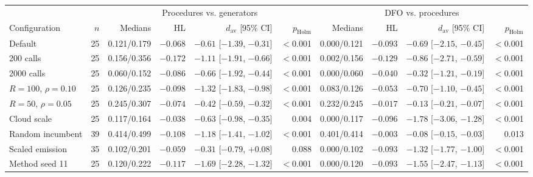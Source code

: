 \begin{tabular}{@{}lrrrrrrrrr@{}}
\toprule
 & & \multicolumn{4}{c}{Procedures vs. generators} & \multicolumn{4}{c}{DFO vs. procedures} \\
\cmidrule(lr){3-6}\cmidrule(l){7-10}
Configuration & $n$ & Medians & HL & $d_{\mathrm{av}}$ [95\% CI] & $p_{\mathrm{Holm}}$ & Medians & HL & $d_{\mathrm{av}}$ [95\% CI] & $p_{\mathrm{Holm}}$ \\
\midrule
Default & 25 & 0.121/0.179 & $-0.068$ & $-0.61$ [$-1.39$, $-0.31$] & $<$0.001 & 0.000/0.121 & $-0.093$ & $-0.69$ [$-2.15$, $-0.45$] & $<$0.001 \\
200 calls & 25 & 0.156/0.356 & $-0.172$ & $-1.11$ [$-1.91$, $-0.66$] & $<$0.001 & 0.002/0.156 & $-0.129$ & $-0.86$ [$-2.71$, $-0.59$] & $<$0.001 \\
2000 calls & 25 & 0.060/0.152 & $-0.086$ & $-0.66$ [$-1.92$, $-0.44$] & $<$0.001 & 0.000/0.060 & $-0.040$ & $-0.32$ [$-1.21$, $-0.19$] & $<$0.001 \\
$R=100$, $\rho=0.10$ & 25 & 0.126/0.235 & $-0.098$ & $-1.32$ [$-1.83$, $-0.98$] & $<$0.001 & 0.083/0.126 & $-0.053$ & $-0.70$ [$-1.10$, $-0.45$] & $<$0.001 \\
$R=50$, $\rho=0.05$ & 25 & 0.245/0.307 & $-0.074$ & $-0.42$ [$-0.59$, $-0.32$] & $<$0.001 & 0.232/0.245 & $-0.017$ & $-0.13$ [$-0.21$, $-0.07$] & $<$0.001 \\
Cloud scale & 25 & 0.117/0.164 & $-0.038$ & $-0.63$ [$-0.98$, $-0.35$] & 0.004 & 0.000/0.117 & $-0.096$ & $-1.78$ [$-3.06$, $-1.28$] & $<$0.001 \\
Random incumbent & 39 & 0.414/0.499 & $-0.108$ & $-1.18$ [$-1.41$, $-1.02$] & $<$0.001 & 0.401/0.414 & $-0.003$ & $-0.08$ [$-0.15$, $-0.03$] & 0.013 \\
Scaled emission & 35 & 0.102/0.201 & $-0.059$ & $-0.31$ [$-0.79$, $+0.08$] & 0.088 & 0.000/0.102 & $-0.093$ & $-1.32$ [$-1.77$, $-1.00$] & $<$0.001 \\
Method seed 11 & 25 & 0.120/0.222 & $-0.117$ & $-1.69$ [$-2.28$, $-1.32$] & $<$0.001 & 0.000/0.120 & $-0.093$ & $-1.55$ [$-2.47$, $-1.13$] & $<$0.001 \\
\bottomrule
\end{tabular}
